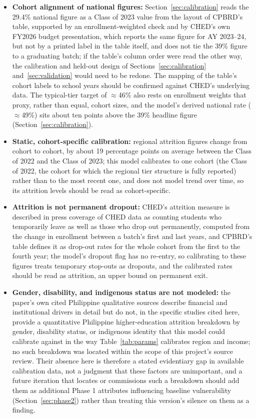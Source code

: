 \documentclass[11pt]{article}
\begin{document}
\begin{itemize}[topsep=2pt,itemsep=3pt,parsep=0pt]
\item \textbf{Cohort alignment of national figures:} Section~\ref{sec:calibration} reads the 29.4\% national figure as a Class of 2023 value from the layout of CPBRD's table, supported by an enrollment-weighted check and by CHED's own FY2026 budget presentation, which reports the same figure for AY 2023--24, but not by a printed label in the table itself, and does not tie the 39\% figure to a graduating batch; if the table's column order were read the other way, the calibration and held-out design of Sections~\ref{sec:calibration} and~\ref{sec:validation} would need to be redone. The mapping of the table's cohort labels to school years should be confirmed against CHED's underlying data. The typical-tier target of $\approx$46\% also rests on enrollment weights that proxy, rather than equal, cohort sizes, and the model's derived national rate ($\approx$49\%) sits about ten points above the 39\% headline figure (Section~\ref{sec:calibration}).
\item \textbf{Static, cohort-specific calibration:} regional attrition figures change from cohort to cohort, by about 19 percentage points on average between the Class of 2022 and the Class of 2023; this model calibrates to one cohort (the Class of 2022, the cohort for which the regional tier structure is fully reported) rather than to the most recent one, and does not model trend over time, so its attrition levels should be read as cohort-specific.
\item \textbf{Attrition is not permanent dropout:} CHED's attrition measure is described in press coverage of CHED data as counting students who temporarily leave as well as those who drop out permanently, computed from the change in enrollment between a batch's first and last years, and CPBRD's table defines it as drop-out rates for the whole cohort from the first to the fourth year; the model's dropout flag has no re-entry, so calibrating to these figures treats temporary stop-outs as dropouts, and the calibrated rates should be read as attrition, an upper bound on permanent exit.
\item \textbf{Gender, disability, and indigenous status are not modeled:} the paper's own cited Philippine qualitative sources \citep{cahilog2025,socioeconomic2024} describe financial and institutional drivers in detail but do not, in the specific studies cited here, provide a quantitative Philippine higher-education attrition breakdown by gender, disability status, or indigenous identity that this model could calibrate against in the way Table~\ref{tab:params} calibrates region and income; no such breakdown was located within the scope of this project's source review. Their absence here is therefore a stated evidentiary gap in available calibration data, not a judgment that these factors are unimportant, and a future iteration that locates or commissions such a breakdown should add them as additional Phase 1 attributes influencing baseline vulnerability (Section~\ref{sec:phase2}) rather than treating this version's silence on them as a finding.

\end{itemize}
\end{document}
